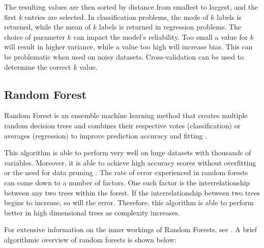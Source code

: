 The resulting values are then sorted by distance from smallest to largest, and the first $k$ entries are selected. 
In classification problems, the mode of $k$ labels is returned, while the mean of $k$ labels is returned in regression problems.
The choice of parameter $k$ can impact the model's reliability. Too small a value for $k$ will result in higher variance, while a value too high will increase bias. 
This can be problematic when used on noisy datasets. Cross-validation can be used to determine the correct $k$ value.

\subsection{Random Forest}
\label{sec:rand}
Random Forest is an ensemble machine learning method that creates multiple random decision trees and combines their respective votes (classification) or averages (regression) to improve prediction accuracy and fitting \cite{rf}.


This algorithm is able to perform very well on huge datasets with thousands of variables. 
Moreover, it is able to achieve high accuracy scores without overfitting or the need for data pruning \cite{8074494}.
The rate of error experienced in random forests can come down to a number of factors.
One such factor is the interrelationship between any two trees within the forest. 
If the interrelationship between two trees begins to increase, so will the error.
Therefore, this algorithm is able to perform better in high dimensional trees as complexity increases.
 
For extensive information on the inner workings of Random Forests, see \cite{10.5555/2503308.2343682}.
A brief algorithmic overview of random forests \cite{rf} is shown below:

